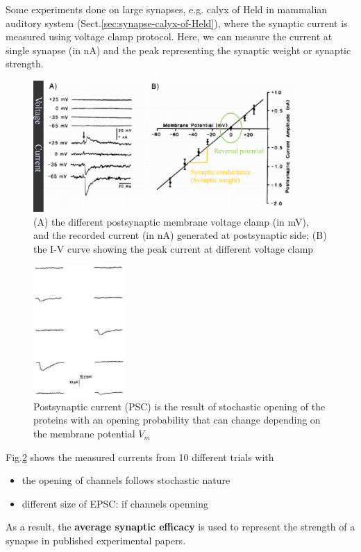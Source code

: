 Some experiments done on large synapses, e.g. calyx of Held in mammalian
auditory system (Sect.\ref{sec:synapse-calyx-of-Held}), where the synaptic
current is measured using voltage clamp protocol. Here, we can measure the
current at single synapse (in nA) and the peak representing the synaptic weight
or synaptic strength.

\begin{figure}[hbt]
 \centerline{\includegraphics[height=5cm]{./images/synapse-voltage-current-curve.eps}}
 \caption{(A) the different postsynaptic membrane voltage clamp (in mV), and the
 recorded current (in nA) generated at postsynaptic side; (B) the I-V curve
 showing the peak current at different voltage clamp}
\label{fig:synapse-voltage-current-curve}
\end{figure}

\begin{figure}[htb]
    \centerline{\includegraphics[height=5cm]{./images/PSC_trials.eps}}
    \caption{Postsynaptic current (PSC) is the result of
    stochastic opening of the proteins with an opening
    probability that can change depending on the membrane
    potential $V_m$}\label{fig:PSC_trials}
\end{figure}


Fig.\ref{fig:PSC_trials} shows the measured currents from 10 different trials
with
\begin{itemize}
  \item the opening of channels follows stochastic nature
  
  \item different size of EPSC: if channels openning
\end{itemize}
As a result, the {\bf average synaptic efficacy} is used to represent the
strength of a synapse in published experimental papers.

